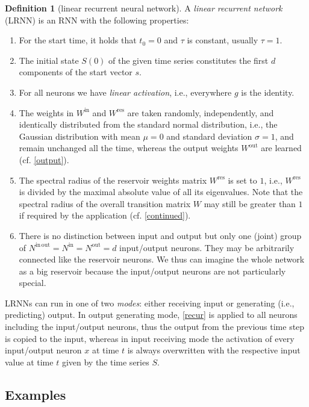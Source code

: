 \documentclass[twoside,11pt]{article}
\theoremstyle{definition}
\newtheorem{defn}{Definition}
\begin{document}
\begin{defn}[linear recurrent neural network]\label{thedef}
A \emph{linear recurrent network} (LRNN) is an RNN with the
following properties:
\begin{enumerate}
  \item For the start time, it holds that $t_0=0$ and $\tau$ is constant, usually $\tau=1$.
  \item The initial state $S(0)$ of the given time series constitutes the first
	$d$ components of the start vector $s$.
  \item For all neurons we have \emph{linear activation}, i.e., everywhere $g$
	is the identity.
  \item The weights in $W^\mathrm{in}$ and $W^\mathrm{res}$ are taken
	randomly, independently, and identically distributed from the standard
	normal distribution, i.e., the Gaussian distribution with mean $\mu = 0$
	and standard deviation $\sigma = 1$, and remain unchanged all the time,
	whereas the output weights $W^\mathrm{out}$ are learned (cf. \cref{output}).
  \item The spectral radius of the reservoir weights matrix $W^\mathrm{res}$ is
	set to $1$, i.e., $W^\mathrm{res}$ is divided by the maximal absolute
	value of all its eigenvalues. Note that the spectral radius of the
	overall transition matrix $W$ may still be greater than $1$ if required
	by the application (cf. \cref{continued}).
  \item There is no distinction between input and output but only one (joint)
	group of $N^\mathrm{in\,out} = N^\mathrm{in}=N^\mathrm{out}=d$ input/output neurons. They may
	be arbitrarily connected like the reservoir neurons. We thus can imagine
	the whole network as a big reservoir because the input/output neurons
	are not particularly special.
\end{enumerate}
\end{defn}

LRNNs can run in one of two \emph{modes}: either receiving input or generating
(i.e., predicting) output. In output generating mode, \cref{recur} is applied to
all neurons including the input/output neurons, thus the output from the
previous time step is copied to the input, whereas in input receiving mode
the activation of every input/output neuron $x$ at time $t$ is always
overwritten with the respective input value at time $t$ given by the time series
$S$.

\subsection{Examples}
\end{document}
